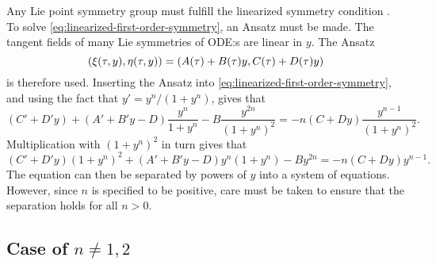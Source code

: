 Any Lie point symmetry group must fulfill the linearized symmetry condition .
To solve \cref{eq:linearized-first-order-symmetry}, an Ansatz must be made.
The tangent fields of many Lie symmetries of ODE:s are linear in \(y\).
The Ansatz
\begin{equation}
  \pqty{\xi(\tau,y),\eta(\tau,y)} = \pqty{A(\tau) + B(\tau)y,C(\tau) + D(\tau)y}
\end{equation}
is therefore used.
Inserting the Ansatz into \cref{eq:linearized-first-order-symmetry}, and using the fact that \(y' = y^n / (1 + y^n)\), gives that
\begin{equation}
  (C' + D'y) + (A' + B'y - D) \frac{y^n}{1 + y^n} - B \frac{y^{2n}}{(1 + y^n)^2} =
  -n(C + Dy) \frac{y^{n-1}}{(1 + y^n)^2}.
\end{equation}
Multiplication with \((1 + y^n)^2\) in turn gives that
\begin{equation} \label{eq:hill-linear-symmetry}
  (C' + D'y)(1 + y^n)^2 + (A' + B'y - D)y^n(1 + y^n) - By^{2n} =
  -n(C + Dy) y^{n-1}.
\end{equation}
The equation can then be separated by powers of \(y\) into a system of equations.
However, since \(n\) is specified to be positive, care must be taken to ensure that the separation holds for all \(n>0\).

\subsection{Case of \texorpdfstring{\(n\neq1,2\)}{n not 1 or 2}}

